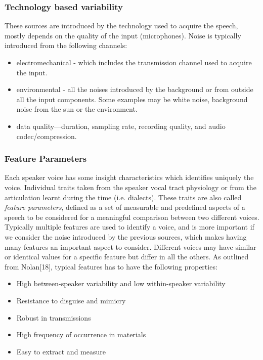 \subsubsection{Technology based variability}
These sources are introduced by the technology used to acquire
the speech, mostly depends on the quality of the input (microphones).
Noise is typically introduced from the following channels:

\begin{itemize}
    \item electromechanical - which includes the
    transmission channel used to acquire the input.
    \item environmental - all the noises introduced by the background or from
    outside all the input components. Some examples may be white noise, background noise
    from the sun or the environment.
    \item data quality—duration, sampling rate, recording quality, and audio codec/compression.
\end{itemize}

\subsubsection{Feature Parameters}
Each speaker voice has some insight characteristics which identifies uniquely
the voice. Individual traits taken from the speaker vocal tract physiology or
from the articulation learnt during the time (i.e. dialects).
These traits are also called \textit{feature parameters}, defined as a set
of measurable and predefined aspects of a speech to be considered for a meaningful
comparison between two different voices. Typically multiple features
are used to identify a voice, and is more important if we consider the noise introduced by
the previous sources, which makes having many features an important aspect to consider.
Different voices may have similar or identical values for a specific feature but differ in all
the others.
As outlined from Nolan[18], typical features has to have the following properties:
\begin{itemize}
    \item High between-speaker variability and low within-speaker variability
    \item Resistance to disguise and mimicry
    \item Robust in transmissions
    \item High frequency of occurrence in materials
    \item Easy to extract and measure

\end{itemize}

